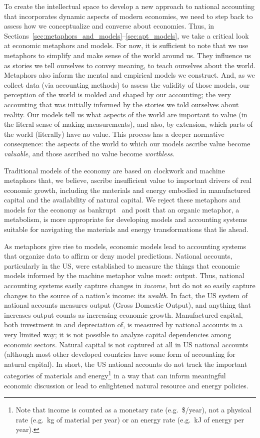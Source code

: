 To create the intellectual space to 
develop a new approach to national accounting that
incorporates dynamic aspects of modern economies,
we need to step back to assess how we conceptualize and converse about economies.
Thus, in Sections~\ref{sec:metaphors_and_models}--\ref{sec:apt_models}, 
we take a critical look at economic metaphors and models.
For now, it is sufficient to note that 
we use metaphors to simplify and make sense of the world around us.
They influence us as stories we tell ourselves to convey meaning,
to teach ourselves about the world.
Metaphors also inform 
the mental and empirical models we construct.
And, as we collect data (via accounting methods) 
to assess the validity of those models,
our perception of the world is molded and shaped
by our accounting;
the very accounting that was initially informed
by the stories we told ourselves about reality.
Our models tell us what aspects of the world
are important to value 
(in the literal sense of making measurements),
and also, by extension, 
which parts of the world (literally) have no value.
This process has a deeper normative consequence: 
the aspects of the world to which our models ascribe
value become \emph{valuable},
and those ascribed no value become \emph{worthless}.

Traditional models of the economy
are based on clockwork and machine metaphors that, we believe, ascribe insufficient value 
to important drivers of real economic growth, including 
the materials and energy embodied in manufactured capital and 
the availability of natural capital.
We reject these metaphors and models 
for the economy as bankrupt~\cite{Liu2012}
and posit that an organic metaphor, a metabolism, 
is more appropriate for developing models and accounting systems
suitable for navigating the materials and energy transformations 
that lie ahead.

As metaphors give rise to models, 
economic models lead to accounting systems that organize data
to affirm or deny model predictions.
National accounts, particularly in the US, 
were established to measure the things that 
economic models informed by the machine metaphor value most: output. 
Thus, national accounting systems easily capture changes in \emph{income}, 
but do not so easily capture changes to the source 
of a nation's income: its \emph{wealth}.
In fact, the US system of national accounts measures output (Gross Domestic Output), 
and anything that increases output 
counts as increasing economic growth. 
Manufactured capital, both investment in and depreciation of, 
is measured by national accounts in a very limited way;
it is not possible to analyze capital dependencies 
among economic sectors.\cite{Streitwieser:2011aa}
Natural capital is not captured at all in US national accounts (although
most other developed countries have some form of accounting for natural capital). 
In short, the US national accounts do not track the important categories 
of materials and energy\footnote{Note that
	income is counted as a monetary rate (e.g.\ \$/year), 
	not a physical rate (e.g.\ kg of material per year)
	or an energy rate (e.g.\ kJ of energy per year).
	} 
in a way that can inform meaningful economic discussion or
lead to enlightened natural resource and energy policies.

